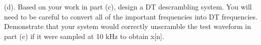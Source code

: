 (d). Based on your work in part (c), design a DT descrambling system. You will need to be careful to convert all of the important frequencies into DT frequencies. Demonstrate that your system would correctly unscramble the test waveform in part (c) if it were sampled at 10 kHz to obtain x[n].

